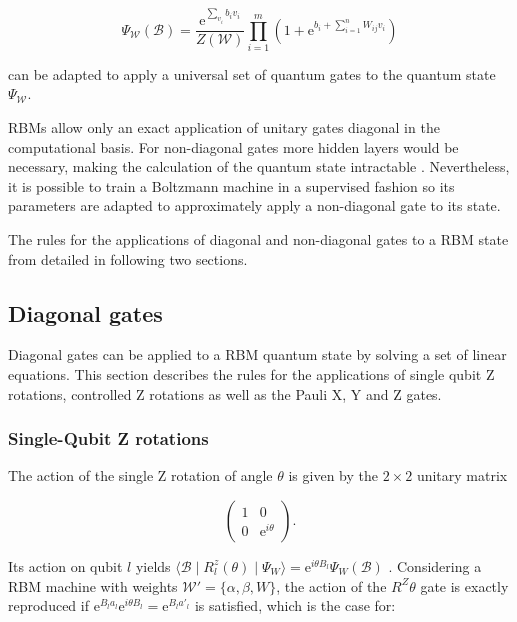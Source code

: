\begin{equation}
   \Psi_{\mathcal{W}}(\mathcal{B}) = \frac{\mathrm{e}^{\sum_{v_i}b_iv_i}}{Z(\mathcal{W})}\prod_{i=1}^m(1+\mathrm{e}^{b_i + \sum_{i=1}^nW_{ij}v_i})
\end{equation}

can be adapted to apply a universal set of quantum gates to the quantum state $\Psi_{\mathcal{W}}$.

RBMs allow only an exact application of unitary gates diagonal in the computational basis. For non-diagonal 
gates more hidden layers would be necessary, making the calculation of the quantum state intractable \cite{carleo2018constructing}. Nevertheless, it is possible to train a Boltzmann machine in a supervised fashion so its parameters 
are adapted to approximately apply a non-diagonal gate to its state.

The rules for the applications of diagonal and non-diagonal gates to a RBM state from 
\cite{jnsson2018neuralnetwork} detailed in following two sections.

\subsection{Diagonal gates}

Diagonal gates can be applied to a RBM quantum state by solving a set of linear equations. 
This section describes the rules for the applications of single qubit Z rotations, controlled Z rotations 
as well as the Pauli X, Y and Z gates.

\subsubsection{Single-Qubit Z rotations}
The action of the single Z rotation of angle $\theta$ is given by the $2\times2$ unitary matrix

\begin{equation}
    \begin{pmatrix}
        1 & 0 \\
        0 & \mathrm{e}^{i\theta}
    \end{pmatrix} .
\end{equation}

Its action on qubit $l$ yields 
$\langle \mathcal{B} \mid R_{l}^{z}(\theta) \mid \Psi_{W}  \rangle = 
\mathrm{e}^{i\theta B_{l}} \Psi_{W}(\mathcal{B})
$
. Considering a RBM machine with weights $\mathcal{W}\prime = \{\alpha,\beta,W\}$, the action of the $R^{Z}{\theta}$
gate is exactly reproduced if $\mathrm{e}^{B_{l}a_{l}}\mathrm{e}^{i\theta B_{l}} = \mathrm{e}^{B_{l}a\prime_{l}}$
is satisfied, which is the case for:

